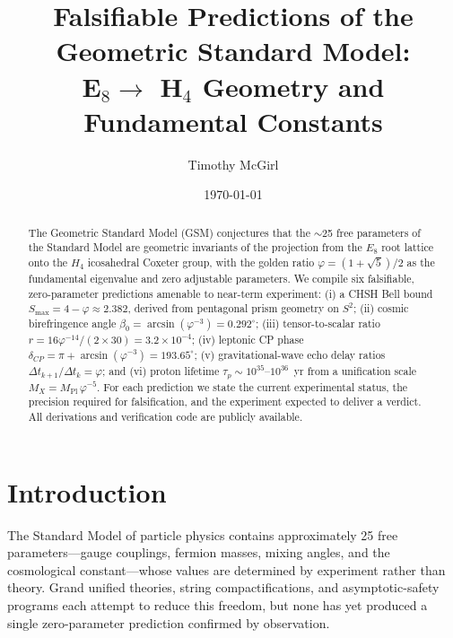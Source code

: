 \documentclass[aps,prl,twocolumn,superscriptaddress,nofootinbib]{revtex4-2}
\newcommand{\vp}{\varphi}
\begin{document}
\title{Falsifiable Predictions of the Geometric Standard Model:\\
E$_8 \to$ H$_4$ Geometry and Fundamental Constants}

\author{Timothy McGirl}

\date{\today}

\begin{abstract}
The Geometric Standard Model (GSM) conjectures that the $\sim$25 free parameters
of the Standard Model are geometric invariants of the projection from the $E_8$
root lattice onto the $H_4$ icosahedral Coxeter group, with the golden ratio
$\vp = (1+\sqrt{5})/2$ as the fundamental eigenvalue and zero adjustable parameters.
We compile six falsifiable, zero-parameter predictions amenable to near-term experiment:
(i) a CHSH Bell bound $S_{\max} = 4 - \vp \approx 2.382$, derived from pentagonal
prism geometry on $S^2$;
(ii) cosmic birefringence angle $\beta_0 = \arcsin(\vp^{-3}) = 0.292^\circ$;
(iii) tensor-to-scalar ratio $r = 16\vp^{-14}/(2 \times 30) = 3.2 \times 10^{-4}$;
(iv) leptonic CP phase $\delta_{CP} = \pi + \arcsin(\vp^{-3}) = 193.65^\circ$;
(v) gravitational-wave echo delay ratios $\Delta t_{k+1}/\Delta t_k = \vp$; and
(vi) proton lifetime $\tau_p \sim 10^{35}$--$10^{36}$~yr from a unification scale
$M_X = M_{\mathrm{Pl}}\,\vp^{-5}$.
For each prediction we state the current experimental status, the precision required
for falsification, and the experiment expected to deliver a verdict.
All derivations and verification code are publicly available.
\end{abstract}

\maketitle

\section{Introduction}

The Standard Model of particle physics contains approximately 25 free parameters---gauge
couplings, fermion masses, mixing angles, and the cosmological constant---whose values
are determined by experiment rather than theory.  Grand unified theories, string
compactifications, and asymptotic-safety programs each attempt to reduce this freedom,
but none has yet produced a single zero-parameter prediction confirmed by observation.
\end{document}
